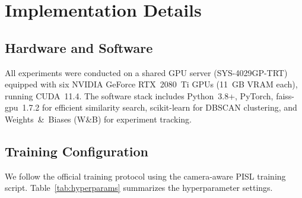 \section{Implementation Details}

\subsection{Hardware and Software}
All experiments were conducted on a shared GPU server (SYS-4029GP-TRT) equipped with six NVIDIA GeForce RTX~2080~Ti GPUs (11~GB VRAM each), running CUDA~11.4. The software stack includes Python~3.8+, PyTorch, faiss-gpu~1.7.2 \cite{johnson2019faiss} for efficient similarity search, scikit-learn for DBSCAN clustering, and Weights~\&~Biases (W\&B) \cite{wandb2020} for experiment tracking.

\subsection{Training Configuration}
We follow the official training protocol using the camera-aware PISL training script. Table~\ref{tab:hyperparams} summarizes the hyperparameter settings.

